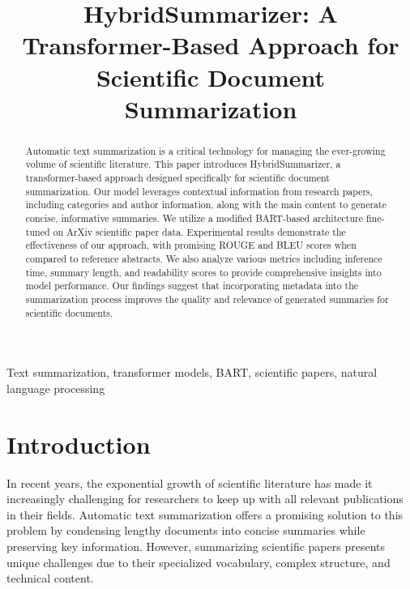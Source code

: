 \documentclass[conference]{IEEEtran}
\begin{document}
\title{HybridSummarizer: A Transformer-Based Approach for Scientific Document Summarization}


\author{
}

\maketitle

\begin{abstract}
Automatic text summarization is a critical technology for managing the ever-growing volume of scientific literature. This paper introduces HybridSummarizer, a transformer-based approach designed specifically for scientific document summarization. Our model leverages contextual information from research papers, including categories and author information, along with the main content to generate concise, informative summaries. We utilize a modified BART-based architecture fine-tuned on ArXiv scientific paper data. Experimental results demonstrate the effectiveness of our approach, with promising ROUGE and BLEU scores when compared to reference abstracts. We also analyze various metrics including inference time, summary length, and readability scores to provide comprehensive insights into model performance. Our findings suggest that incorporating metadata into the summarization process improves the quality and relevance of generated summaries for scientific documents.
\end{abstract}

\begin{IEEEkeywords}
Text summarization, transformer models, BART, scientific papers, natural language processing
\end{IEEEkeywords}

\section{Introduction}
In recent years, the exponential growth of scientific literature has made it increasingly challenging for researchers to keep up with all relevant publications in their fields. Automatic text summarization offers a promising solution to this problem by condensing lengthy documents into concise summaries while preserving key information. However, summarizing scientific papers presents unique challenges due to their specialized vocabulary, complex structure, and technical content.
\end{document}

